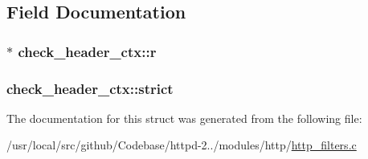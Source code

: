 \subsection{Field Documentation}
\subsubsection[{\texorpdfstring{r}{r}}]{$\ast$ check\+\_\+header\+\_\+ctx\+::r}\hypertarget{structcheck__header__ctx_a1c493689a4f69f9a4fe2fa2dcc95fc36}{}\label{structcheck__header__ctx_a1c493689a4f69f9a4fe2fa2dcc95fc36}
\subsubsection[{\texorpdfstring{strict}{strict}}]{ check\+\_\+header\+\_\+ctx\+::strict}\hypertarget{structcheck__header__ctx_a23a8c2ac4741fc2d14f25e7af0cfc5b5}{}\label{structcheck__header__ctx_a23a8c2ac4741fc2d14f25e7af0cfc5b5}


The documentation for this struct was generated from the following file\+:\begin{DoxyCompactItemize}
\item 
/usr/local/src/github/\+Codebase/httpd-\/2../modules/http/\hyperlink{http__filters_8c}{http\+\_\+filters.\+c}\end{DoxyCompactItemize}
